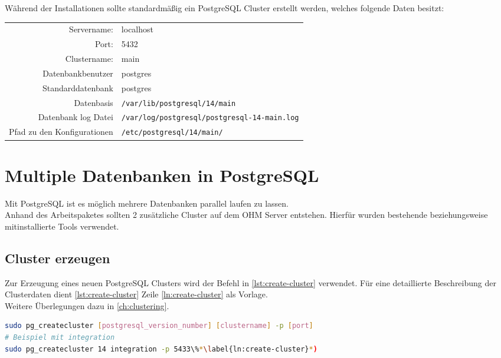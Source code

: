 Während der Installationen sollte standardmäßig ein PostgreSQL Cluster\cite{postgresql-cluster} erstellt werden, welches folgende Daten besitzt:\\[0.5cm]
\begin{tabular}{r l}
	Servername: & localhost\\
	Port: & 5432\\
	Clustername: & main\\
	Datenbankbenutzer & postgres\\
	Standarddatenbank & postgres\\
	Datenbasis & \lstinline[language=bash]|/var/lib/postgresql/14/main|\\
	Datenbank log Datei & \lstinline[language=bash]|/var/log/postgresql/postgresql-14-main.log|\\
	Pfad zu den Konfigurationen & \lstinline[language=bash]|/etc/postgresql/14/main/|\\
\end{tabular}

\newpage
\section{Multiple Datenbanken in PostgreSQL}
Mit PostgreSQL ist es möglich mehrere Datenbanken parallel laufen zu lassen.\\
Anhand des Arbeitspaketes sollten 2 zusätzliche Cluster auf dem OHM Server entstehen. Hierfür wurden bestehende beziehungsweise mitinstallierte Tools verwendet.

\subsection{Cluster erzeugen}\label{subsec:create-cluster}
Zur Erzeugung eines neuen PostgreSQL Clusters wird der Befehl in \autoref{lst:create-cluster} verwendet. Für eine detaillierte Beschreibung der Clusterdaten dient \autoref{lst:create-cluster} Zeile \ref{ln:create-cluster} als Vorlage.\\ Weitere Überlegungen dazu in \autoref{ch:clustering}.
\begin{lstlisting}[language=bash,caption={Erzeugung eines PostgreSQL Clusters},label={lst:create-cluster}]
sudo pg_createcluster [postgresql_version_number] [clustername] -p [port]
# Beispiel mit integration
sudo pg_createcluster 14 integration -p 5433\%*\label{ln:create-cluster}*)
\end{lstlisting}

